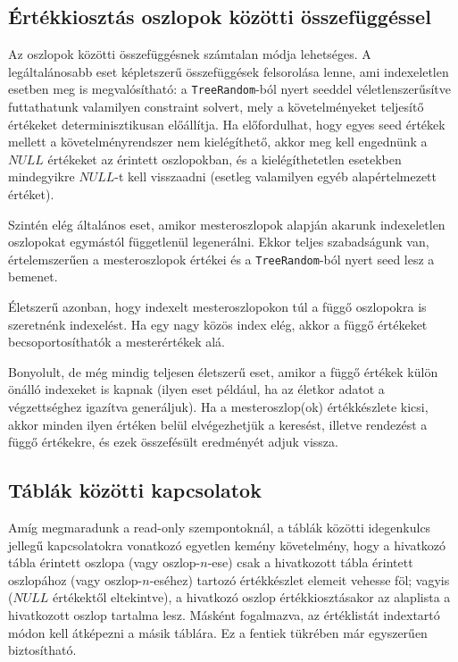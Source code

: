 \documentclass[
    parspace,
    noindent,
    nohyp,
]{elteiktdk}[2023/04/10]
\begin{document}
\subsection{Értékkiosztás oszlopok közötti összefüggéssel}

Az oszlopok közötti összefüggésnek számtalan módja lehetséges.
A legáltalánosabb eset képletszerű összefüggések felsorolása lenne,
ami indexeletlen esetben meg is megvalósítható:
a \texttt{TreeRandom}-ból nyert seeddel véletlenszerűsítve futtathatunk valamilyen constraint solvert,
mely a követelményeket teljesítő értékeket determinisztikusan előállítja.
Ha előfordulhat, hogy egyes seed értékek mellett a követelményrendszer nem kielégíthető,
akkor meg kell engednünk a $NULL$ értékeket az érintett oszlopokban,
és a kielégíthetetlen esetekben mindegyikre $NULL$-t kell visszaadni
(esetleg valamilyen egyéb alapértelmezett értéket).

Szintén elég általános eset, amikor mesteroszlopok
alapján akarunk indexeletlen oszlopokat egymástól függetlenül legenerálni.
Ekkor teljes szabadságunk van,
értelemszerűen a mesteroszlopok értékei és a \texttt{TreeRandom}-ból nyert seed lesz a bemenet.

Életszerű azonban, hogy indexelt mesteroszlopokon túl
a függő oszlopokra is szeretnénk indexelést.
Ha egy nagy közös index elég,
akkor a függő értékeket becsoportosíthatók a mesterértékek alá.

Bonyolult, de még mindig teljesen életszerű eset,
amikor a függő értékek külön önálló indexeket is kapnak
(ilyen eset például, ha az életkor adatot a végzettséghez igazítva generáljuk).
Ha a mesteroszlop(ok) értékkészlete kicsi,
akkor minden ilyen értéken belül elvégezhetjük a keresést, illetve rendezést a függő értékekre,
és ezek összefésült eredményét adjuk vissza.

\subsection{Táblák közötti kapcsolatok}

Amíg megmaradunk a read-only szempontoknál,
a táblák közötti idegenkulcs jellegű kapcsolatokra vonatkozó egyetlen kemény követelmény,
hogy a hivatkozó tábla érintett oszlopa (vagy oszlop-$n$-ese)
csak a hivatkozott tábla érintett oszlopához (vagy oszlop-$n$-eséhez)
tartozó értékkészlet elemeit vehesse föl;
vagyis ($NULL$ értékektől eltekintve),
a hivatkozó oszlop értékkiosztásakor az alaplista a hivatkozott oszlop tartalma lesz.
Másként fogalmazva, az értéklistát indextartó módon kell átképezni a másik táblára.
Ez a fentiek tükrében már egyszerűen biztosítható.
\end{document}
